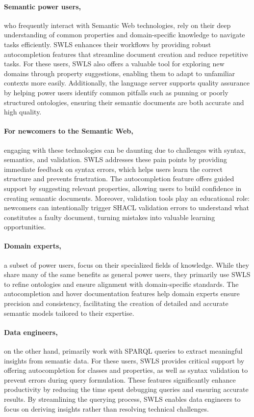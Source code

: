 \paragraph{Semantic power users,} who frequently interact with Semantic Web technologies, rely on their deep understanding of common properties and domain-specific knowledge to navigate tasks efficiently.
SWLS enhances their workflows by providing robust autocompletion features that streamline document creation and reduce repetitive tasks.
For these users, SWLS also offers a valuable tool for exploring new domains through property suggestions, enabling them to adapt to unfamiliar contexts more easily. 
Additionally, the language server supports quality assurance by helping power users identify common pitfalls such as punning or poorly structured ontologies, ensuring their semantic documents are both accurate and high quality.

\paragraph{For newcomers to the Semantic Web,} engaging with these technologies can be daunting due to challenges with syntax, semantics, and validation. 
SWLS addresses these pain points by providing immediate feedback on syntax errors, which helps users learn the correct structure and prevents frustration.
The autocompletion feature offers guided support by suggesting relevant properties, allowing users to build confidence in creating semantic documents.
Moreover, validation tools play an educational role: newcomers can intentionally trigger SHACL validation errors to understand what constitutes a faulty document,
turning mistakes into valuable learning opportunities.

\paragraph{Domain experts,} a subset of power users, focus on their specialized fields of knowledge. 
While they share many of the same benefits as general power users, they primarily use SWLS to refine ontologies and ensure alignment with domain-specific standards. 
The autocompletion and hover documentation features help domain experts ensure precision and consistency, facilitating the creation of detailed and accurate semantic models tailored to their expertise.

\paragraph{Data engineers,} on the other hand, primarily work with SPARQL queries to extract meaningful insights from semantic data. 
For these users, SWLS provides critical support by offering autocompletion for classes and properties, as well as syntax validation to prevent errors during query formulation. 
These features significantly enhance productivity by reducing the time spent debugging queries and ensuring accurate results. 
By streamlining the querying process, SWLS enables data engineers to focus on deriving insights rather than resolving technical challenges.


